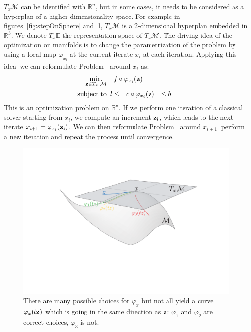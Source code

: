 $T_x\mathcal{M}$ can be identified with $\mathbb{R}^n$, but in some cases, it needs to be considered as a hyperplan of a higher dimensionality space.
For example in figures~\ref{fig:stepOnSphere} and~\ref{fig:phimap}, $T_x\mathcal{M}$ is a 2-dimensional hyperplan embedded in $\mathbb{R}^3$.
We denote $T_x\mathbb{E}$ the representation space of $T_x\mathcal{M}$.
The driving idea of the optimization on manifolds is to change the parametrization of the problem by using a local map $\varphi_{x_i}$ at the current iterate $x_i$ at each iteration.
Applying this idea, we can reformulate Problem~ around $x_i$ as:
\begin{align}
\label{eq:local_problem}
\operatorname*{min.}_{{\bf z} \in T_{x_i}\mathcal{M}} & \quad f \circ \varphi_{x_i}({\bf z}) \\
  \text{subject to}&
  \begin{array}{rcl}
    {l} \leq & c \circ \varphi_{x_i}({\bf z}) & \leq {b} \nonumber
  \end{array}
\end{align}
This is an optimization problem on $\mathbb{R}^n$.
If we perform one iteration of a classical solver starting from $x_i$, we compute an increment ${\bf z_i}$, which leads to the next iterate $x_{i+1} = \varphi_{x_i}({\bf z_i})$.
We can then reformulate Problem~ around $x_{i+1}$, perform a new iteration and repeat the process until convergence.

\begin{figure}[!htb]
  \centering
  \includegraphics[width=.9\linewidth]{Humanoids2015/manifold.pdf}
  \caption{There are many possible choices for $\varphi_{x}$ but not all yield a curve $\varphi_{x}(t{\bf z})$ which is going in the same direction as ${\bf z}$: $\varphi_{1}$ and $\varphi_{2}$ are correct choices, $\varphi_{3}$ is not.}
\label{fig:phimap}
\end{figure}

